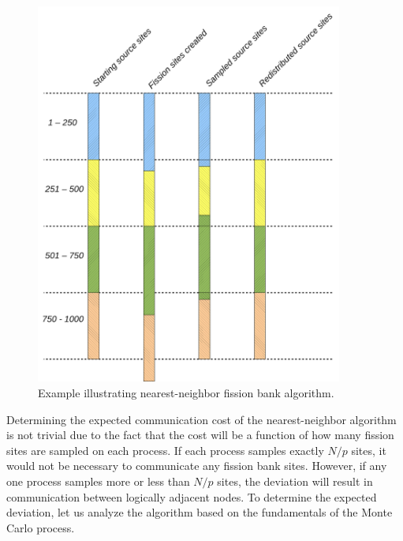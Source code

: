 \begin{figure}[ht!]
  \centering
  \includegraphics[width=0.9\textwidth]{figures/ch3/algorithm_schematic/nearest-neighbor-example.pdf}
  \caption{Example illustrating nearest-neighbor fission bank algorithm.}
  \label{fig:nearest-neighbor-example}
\end{figure}

Determining the expected communication cost of the nearest-neighbor algorithm is
not trivial due to the fact that the cost will be a function of how many fission
sites are sampled on each process. If each process samples exactly $N/p$ sites,
it would not be necessary to communicate any fission bank sites. However, if any
one process samples more or less than $N/p$ sites, the deviation will result in
communication between logically adjacent nodes. To determine the expected
deviation, let us analyze the algorithm based on the fundamentals of the Monte
Carlo process.

